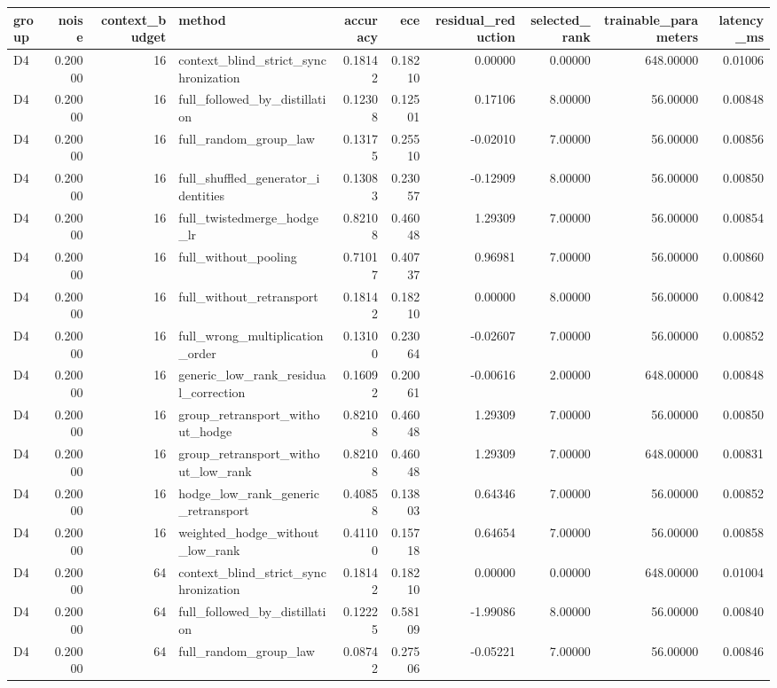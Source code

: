 \begin{tabular}{lrrlrrrrrr}
\toprule
group & noise & context_budget & method & accuracy & ece & residual_reduction & selected_rank & trainable_parameters & latency_ms \\
\midrule
D4 & 0.20000 & 16 & context_blind_strict_synchronization & 0.18142 & 0.18210 & 0.00000 & 0.00000 & 648.00000 & 0.01006 \\
D4 & 0.20000 & 16 & full_followed_by_distillation & 0.12308 & 0.12501 & 0.17106 & 8.00000 & 56.00000 & 0.00848 \\
D4 & 0.20000 & 16 & full_random_group_law & 0.13175 & 0.25510 & -0.02010 & 7.00000 & 56.00000 & 0.00856 \\
D4 & 0.20000 & 16 & full_shuffled_generator_identities & 0.13083 & 0.23057 & -0.12909 & 8.00000 & 56.00000 & 0.00850 \\
D4 & 0.20000 & 16 & full_twistedmerge_hodge_lr & 0.82108 & 0.46048 & 1.29309 & 7.00000 & 56.00000 & 0.00854 \\
D4 & 0.20000 & 16 & full_without_pooling & 0.71017 & 0.40737 & 0.96981 & 7.00000 & 56.00000 & 0.00860 \\
D4 & 0.20000 & 16 & full_without_retransport & 0.18142 & 0.18210 & 0.00000 & 8.00000 & 56.00000 & 0.00842 \\
D4 & 0.20000 & 16 & full_wrong_multiplication_order & 0.13100 & 0.23064 & -0.02607 & 7.00000 & 56.00000 & 0.00852 \\
D4 & 0.20000 & 16 & generic_low_rank_residual_correction & 0.16092 & 0.20061 & -0.00616 & 2.00000 & 648.00000 & 0.00848 \\
D4 & 0.20000 & 16 & group_retransport_without_hodge & 0.82108 & 0.46048 & 1.29309 & 7.00000 & 56.00000 & 0.00850 \\
D4 & 0.20000 & 16 & group_retransport_without_low_rank & 0.82108 & 0.46048 & 1.29309 & 7.00000 & 648.00000 & 0.00831 \\
D4 & 0.20000 & 16 & hodge_low_rank_generic_retransport & 0.40858 & 0.13803 & 0.64346 & 7.00000 & 56.00000 & 0.00852 \\
D4 & 0.20000 & 16 & weighted_hodge_without_low_rank & 0.41100 & 0.15718 & 0.64654 & 7.00000 & 56.00000 & 0.00858 \\
D4 & 0.20000 & 64 & context_blind_strict_synchronization & 0.18142 & 0.18210 & 0.00000 & 0.00000 & 648.00000 & 0.01004 \\
D4 & 0.20000 & 64 & full_followed_by_distillation & 0.12225 & 0.58109 & -1.99086 & 8.00000 & 56.00000 & 0.00840 \\
D4 & 0.20000 & 64 & full_random_group_law & 0.08742 & 0.27506 & -0.05221 & 7.00000 & 56.00000 & 0.00846 \\

\end{tabular}
